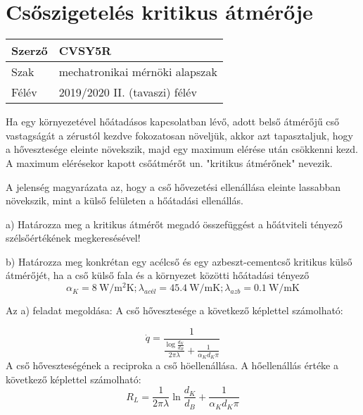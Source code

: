 
\section*{Csőszigetelés kritikus átmérője}


\begin{tabular}{ | p{2cm} | p{14cm} | } 
	\hline
	Szerző & CVSY5R \\ 
	\hline
	Szak & mechatronikai mérnöki alapszak \\ 
	\hline
	Félév & 2019/2020 II. (tavaszi) félév \\ 
	\hline
\end{tabular}
\vspace{0.5cm}

\noindent Ha egy környezetével hőátadásos kapcsolatban lévő, adott belső átmérőjű cső vastagságát a zérustól kezdve fokozatosan növeljük, akkor azt tapasztaljuk, hogy a hővesztesége eleinte növekszik, majd egy maximum elérése után csökkenni kezd. A maximum elérésekor kapott csőátmérőt un. "kritikus átmérőnek" nevezik.

A jelenség magyarázata az, hogy a cső hővezetési ellenállása eleinte lassabban növekszik, mint a külső felületen a hőátadási ellenállás.

a) Határozza meg a kritikus átmérőt megadó összefüggést a hőátviteli tényező szélsőértékének megkeresésével!

b) Határozza meg konkrétan egy acélcső és egy azbeszt-cementcső kritikus külső átmérőjét, ha a cső külső fala és a környezet közötti hőátadási tényező 
\[\alpha_K = \SI{8}{\watt\per\meter\squared\kelvin}; \lambda_{\textit{acél}} = \SI{45,4}{\watt\per\meter\kelvin}; \lambda_{azb} = \SI{0,1}{\watt\per\meter\kelvin}\]

Az a) feladat megoldása:
A cső hővesztesége a következő képlettel számolható: 

\begin{equation}
	\dot{q} = \frac{1}{\frac{\log{\frac{d_K}{d_B}}}{2 \pi \lambda}+\frac{1}{\alpha_K d_K \pi}}
\end{equation}
A cső hőveszteségének a reciproka a cső höellenállása. A hőellenállás értéke a következő képlettel számolható:
\begin{equation}
	R_L = \frac{1}{2 \pi \lambda}\ln{\frac{d_K}{d_B}}+\frac{1}{\alpha_K d_K \pi} 
\end{equation}


